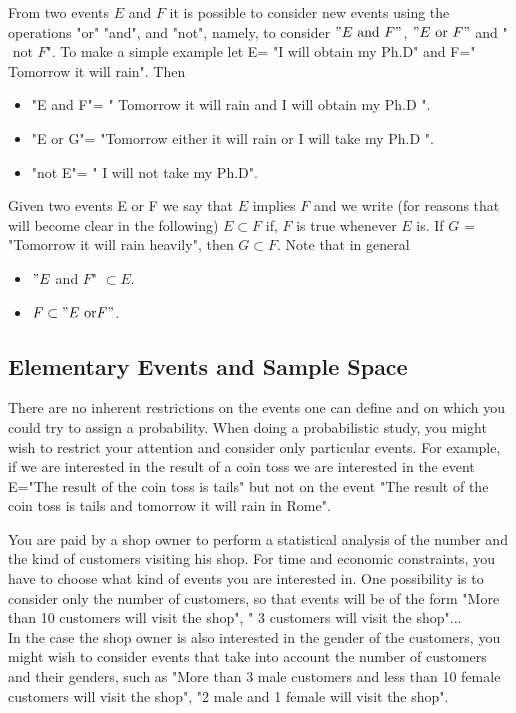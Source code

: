 From two events $E$ and $F$ it is possible to consider new events using the operations "or" "and", and "not", namely, to consider $"E \textrm{ and }   F"$, $ "E \textrm{ or } F"$ and "$\textrm{ not } F$". To make a simple example let E= "I will obtain my Ph.D" and F=" Tomorrow it will rain". Then   

\begin{itemize}

	\item "E and F"= " Tomorrow it will rain and I will obtain my Ph.D ".
	\item "E or G"= "Tomorrow either it will rain or I will take my Ph.D ".
	\item "not E"= " I will not take my Ph.D".

\end{itemize}

Given two events E or F we say that $E$ implies $F$ and we write (for reasons that will become clear in the following) $E \subset F$ if, $F$ is true whenever $E$ is. If $G $ = "Tomorrow it will rain heavily", then $G \subset F$. Note that in general 
	\begin{itemize}
		\item $"E$ and $F$" $\subset  E$. \\
		\item $ F \subset "E  \text{ or}  F"$. 
	\end{itemize}


\subsection{Elementary Events and Sample Space}

There are no inherent restrictions on the events one can define and on which you could try to assign a probability. When doing a probabilistic study, you might wish to restrict your attention and consider only particular events. For example, if we are interested in the result of a coin toss we are interested in the event E="The result of the coin toss is tails" but not on the event "The result of the coin toss is tails and tomorrow it will rain in Rome".\\

\begin{example}
	You are paid by a shop owner to perform a statistical analysis of the number and the kind of customers visiting his shop. For time and economic constraints, you have to choose what kind of events you are interested in. One possibility is to consider only the number of customers, so that events will be of the form "More than 10 customers will visit the shop", " 3 customers will visit the shop"... \\
	In the case the shop owner is also interested in the gender of the customers, you might wish to consider events that take into account the number of customers and their genders, such as "More than 3 male customers and less than 10 female customers will visit the shop", "2 male and 1 female will visit the shop". 
\end{example}

